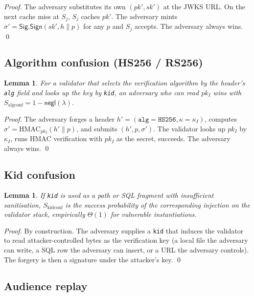 \documentclass[11pt,a4paper]{article}
\theoremstyle{plain}
\newtheorem{lemma}[theorem]{Lemma}
\theoremstyle{definition}
\newcommand{\Sig}{\mathsf{Sig}}
\newcommand{\negl}{\mathsf{negl}}
\newcommand{\Sign}{\mathsf{Sign}}
\begin{document}
\begin{proof}
The adversary substitutes its own $(pk', sk')$ at the JWKS URL. On the
next cache miss at $S_j$, $S_j$ caches $pk'$. The adversary mints
$\sigma' = \Sig.\Sign(sk', h \| p)$ for any $p$ and $S_j$ accepts. The
adversary always wins. \qed
\end{proof}

\subsection{Algorithm confusion (HS256 / RS256)}

\begin{lemma}
\label{lem:algconf}
For a validator that selects the verification algorithm by the header's
\texttt{alg} field and looks up the key by \texttt{kid}, an adversary
who can read $pk_I$ wins with $S_{\text{algconf}} = 1 - \negl(\lambda)$.
\end{lemma}

\begin{proof}
The adversary forges a header $h' = (\texttt{alg}=\texttt{HS256},
\kappa=\kappa_I)$, computes
$\sigma' = \mathrm{HMAC}_{pk_I}(h' \| p)$, and submits $(h', p, \sigma')$.
The validator looks up $pk_I$ by $\kappa_I$, runs $\mathrm{HMAC}$
verification with $pk_I$ as the secret, succeeds. The adversary always
wins. \qed
\end{proof}

\subsection{Kid confusion}

\begin{lemma}
\label{lem:kidconf}
If \texttt{kid} is used as a path or SQL fragment with insufficient
sanitisation, $S_{\text{kidconf}}$ is the success probability of the
corresponding injection on the validator stack, empirically
$\Theta(1)$ for vulnerable instantiations.
\end{lemma}

\begin{proof}
By construction. The adversary supplies a \texttt{kid} that induces the
validator to read attacker-controlled bytes as the verification key (a
local file the adversary can write, a SQL row the adversary can insert,
or a URL the adversary controls). The forgery is then a signature under
the attacker's key. \qed
\end{proof}

\subsection{Audience replay}
\end{document}
